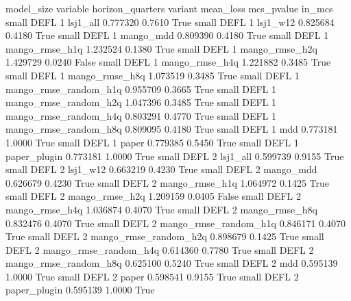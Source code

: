 model_size variable  horizon_quarters               variant  mean_loss  mcs_pvalue  in_mcs
     small     DEFL                 1              lsj1_all   0.777320      0.7610    True
     small     DEFL                 1              lsj1_w12   0.825684      0.4180    True
     small     DEFL                 1             mango_mdd   0.809390      0.4180    True
     small     DEFL                 1        mango_rmse_h1q   1.232524      0.1380    True
     small     DEFL                 1        mango_rmse_h2q   1.429729      0.0240   False
     small     DEFL                 1        mango_rmse_h4q   1.221882      0.3485    True
     small     DEFL                 1        mango_rmse_h8q   1.073519      0.3485    True
     small     DEFL                 1 mango_rmse_random_h1q   0.955709      0.3665    True
     small     DEFL                 1 mango_rmse_random_h2q   1.047396      0.3485    True
     small     DEFL                 1 mango_rmse_random_h4q   0.803291      0.4770    True
     small     DEFL                 1 mango_rmse_random_h8q   0.809095      0.4180    True
     small     DEFL                 1                   mdd   0.773181      1.0000    True
     small     DEFL                 1                 paper   0.779385      0.5450    True
     small     DEFL                 1          paper_plugin   0.773181      1.0000    True
     small     DEFL                 2              lsj1_all   0.599739      0.9155    True
     small     DEFL                 2              lsj1_w12   0.663219      0.4230    True
     small     DEFL                 2             mango_mdd   0.626679      0.4230    True
     small     DEFL                 2        mango_rmse_h1q   1.064972      0.1425    True
     small     DEFL                 2        mango_rmse_h2q   1.209159      0.0405   False
     small     DEFL                 2        mango_rmse_h4q   1.036874      0.4070    True
     small     DEFL                 2        mango_rmse_h8q   0.832476      0.4070    True
     small     DEFL                 2 mango_rmse_random_h1q   0.846171      0.4070    True
     small     DEFL                 2 mango_rmse_random_h2q   0.898679      0.1425    True
     small     DEFL                 2 mango_rmse_random_h4q   0.614360      0.7780    True
     small     DEFL                 2 mango_rmse_random_h8q   0.625100      0.5240    True
     small     DEFL                 2                   mdd   0.595139      1.0000    True
     small     DEFL                 2                 paper   0.598541      0.9155    True
     small     DEFL                 2          paper_plugin   0.595139      1.0000    True
